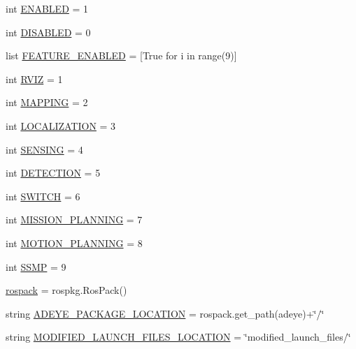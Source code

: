 \begin{DoxyCompactItemize}
\item 
int \hyperlink{namespacerp__manager_ad9b2dec1c2adc525d94b09f0505b041c}{E\+N\+A\+B\+L\+ED} = 1
\item 
int \hyperlink{namespacerp__manager_af85e17f72f768eba5168eba56041bd69}{D\+I\+S\+A\+B\+L\+ED} = 0
\item 
list \hyperlink{namespacerp__manager_a72ed7a08fe7d40ac96ae84a2f15d504f}{F\+E\+A\+T\+U\+R\+E\+\_\+\+E\+N\+A\+B\+L\+ED} = \mbox{[}True for i in range(9)\mbox{]}
\item 
int \hyperlink{namespacerp__manager_a68068aeea47c1d38c09708b72d400462}{R\+V\+IZ} = 1
\item 
int \hyperlink{namespacerp__manager_acbff7b63b4d20bf93d9281425037cef9}{M\+A\+P\+P\+I\+NG} = 2
\item 
int \hyperlink{namespacerp__manager_a50a8ef40ff1b66406cc44a08b34a8289}{L\+O\+C\+A\+L\+I\+Z\+A\+T\+I\+ON} = 3
\item 
int \hyperlink{namespacerp__manager_a3e3537ea325816427b2b1289f0c80ad6}{S\+E\+N\+S\+I\+NG} = 4
\item 
int \hyperlink{namespacerp__manager_ac227be112745c88525a9667580cec00b}{D\+E\+T\+E\+C\+T\+I\+ON} = 5
\item 
int \hyperlink{namespacerp__manager_a1638954fddcfcecdb0f5ea6dcaeb349e}{S\+W\+I\+T\+CH} = 6
\item 
int \hyperlink{namespacerp__manager_a02a3da6c0c6f1434866a0e755a91b611}{M\+I\+S\+S\+I\+O\+N\+\_\+\+P\+L\+A\+N\+N\+I\+NG} = 7
\item 
int \hyperlink{namespacerp__manager_a82d79fb07692d1357006f56f6d1b99da}{M\+O\+T\+I\+O\+N\+\_\+\+P\+L\+A\+N\+N\+I\+NG} = 8
\item 
int \hyperlink{namespacerp__manager_afa43e98bce9dbb3e8c4ebddcae4e025d}{S\+S\+MP} = 9
\item 
\hyperlink{namespacerp__manager_ae453dc601914cd184683c09184ce35c3}{rospack} = rospkg.\+Ros\+Pack()
\item 
string \hyperlink{namespacerp__manager_a86043a0cf61411011e16931d9164b284}{A\+D\+E\+Y\+E\+\_\+\+P\+A\+C\+K\+A\+G\+E\+\_\+\+L\+O\+C\+A\+T\+I\+ON} = rospack.\+get\+\_\+path(\textquotesingle{}adeye\textquotesingle{})+\char`\"{}/\char`\"{}
\item 
string \hyperlink{namespacerp__manager_a43208312336e22fa0f9a976a69e1519e}{M\+O\+D\+I\+F\+I\+E\+D\+\_\+\+L\+A\+U\+N\+C\+H\+\_\+\+F\+I\+L\+E\+S\+\_\+\+L\+O\+C\+A\+T\+I\+ON} = \char`\"{}modified\+\_\+launch\+\_\+files/\char`\"{}
\item 

\end{DoxyCompactItemize}
